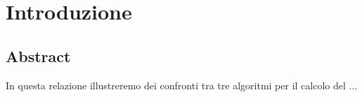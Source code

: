 \section{Introduzione}

\subsection{Abstract}

In questa relazione illustreremo dei confronti tra tre algoritmi per il calcolo del ...

